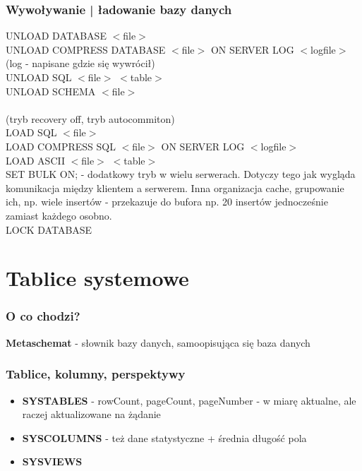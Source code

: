 \documentclass[a4paper,twoside]{article}
\begin{document}
  	\section*{Wywoływanie | ładowanie bazy danych} \noindent 
  	UNLOAD DATABASE $ < $file$ > $\\
  	UNLOAD COMPRESS DATABASE $ < $file$ > $ ON SERVER LOG $ < $logfile$ > $ (log - napisane gdzie się wywrócił)\\
  	UNLOAD SQL $ < $file$ > $ $ < $table$ > $\\
  	UNLOAD SCHEMA $ < $file$ > $\\\\
  	(tryb recovery off, tryb autocommiton)\\
  	LOAD SQL $ < $file$ > $\\
  	LOAD COMPRESS SQL $ < $file$ > $ ON SERVER LOG $ < $logfile$ > $\\
  	LOAD ASCII $ < $file$ > $ $ < $table$ > $\\
  	SET BULK ON; - dodatkowy tryb w wielu serwerach. Dotyczy tego jak wygląda komunikacja między klientem a serwerem. Inna organizacja cache, grupowanie ich, np. wiele insertów - przekazuje do bufora np. 20 insertów jednocześnie zamiast każdego osobno.\\
  	LOCK DATABASE
  	
  	
  	\part*{Tablice systemowe}
  	\section*{O co chodzi?}
  	\textbf{Metaschemat} - słownik bazy danych, samoopisująca się baza danych
  	\section*{Tablice, kolumny, perspektywy}
  	\begin{itemize}
  		\item \textbf{SYSTABLES} - rowCount, pageCount, pageNumber - w miarę aktualne, ale raczej aktualizowane na żądanie
  		\item \textbf{SYSCOLUMNS} - też dane statystyczne + średnia długość pola
  		\item \textbf{SYSVIEWS}
  	\end{itemize}
\end{document}
